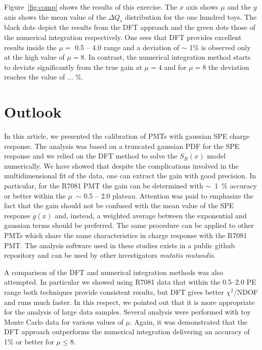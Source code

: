 \documentclass[a4paper,11pt]{article}
\begin{document}
Figure~\ref{fig:comp} shows the results of this exercise. 
The $x$ axis shows $\mu$ and the $y$ axis shows the mean value of the $\Delta Q_s$ distribution for the one hundred toys. 
The black dots depict the results from the DFT approach and the green dots those of the numerical integration respectively. 
One sees that DFT provides excellent results inside the $\mu = $ 0.5 -- 4.0 range and a deviation of $\sim$ 1\% is observed only at the high value of $\mu=8$. 
In contrast, the numerical integration method starts to deviate significantly from the true gain at $\mu=4$ and for $\mu=8$ the deviation reaches the value of ... \%. 



\section{Outlook}
\label{sec:outro}

In this article, we presented the calibration of PMTs with gaussian SPE charge response. %
The analysis was based on a truncated gaussian PDF for the SPE response and we relied on the DFT method to solve the $S_R(x)$ model numerically. 
We have showed that despite the complications involved in the multidimensional fit of the data, one can extract the gain with good precision. 
In particular, for the R7081 PMT the gain can be determined with $\sim$~1~\% accuracy or better within the $\mu$~$\sim$ 0.5 -- 2.0 plateau. 
Attention was paid to emphasize the fact that the gain should not be confused with the mean value of the SPE response $g(x)$ and, instead, a weighted average between the exponential and gaussian terms should be preferred. 
The same procedure can be applied to other PMTs which share the same characteristics in charge response with the R7081 PMT. 
The analysis software used in these studies exists in a public github repository and can be used by other investigators \emph{mutatis mutandis}. 

A comparison of the DFT and numerical integration methods was also attempted. 
In particular we showed using R7081 data that within the 0.5--2.0 PE range both techniques provide consistent results, but DFT gives better $\chi^2$/NDOF and runs much faster. 
In this respect, we pointed out that it is more appropriate for the analysis of large data samples. 
Several analysis were performed with toy Monte Carlo data for various values of $\mu$. 
Again, it was demonstrated that the DFT approach outperforms the numerical integration delivering an accuracy of 1\% or better for $\mu\le 8 $. 
\end{document}
